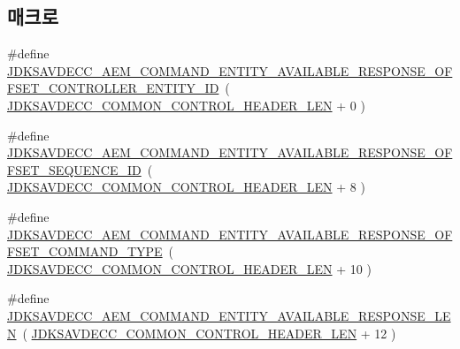 \subsection*{매크로}
\begin{DoxyCompactItemize}
\item 
\#define \hyperlink{group__command__entity__available__response_ga6311cc5609d1efec9e0e96bcf329511c}{J\+D\+K\+S\+A\+V\+D\+E\+C\+C\+\_\+\+A\+E\+M\+\_\+\+C\+O\+M\+M\+A\+N\+D\+\_\+\+E\+N\+T\+I\+T\+Y\+\_\+\+A\+V\+A\+I\+L\+A\+B\+L\+E\+\_\+\+R\+E\+S\+P\+O\+N\+S\+E\+\_\+\+O\+F\+F\+S\+E\+T\+\_\+\+C\+O\+N\+T\+R\+O\+L\+L\+E\+R\+\_\+\+E\+N\+T\+I\+T\+Y\+\_\+\+ID}~( \hyperlink{group__jdksavdecc__avtp__common__control__header_gaae84052886fb1bb42f3bc5f85b741dff}{J\+D\+K\+S\+A\+V\+D\+E\+C\+C\+\_\+\+C\+O\+M\+M\+O\+N\+\_\+\+C\+O\+N\+T\+R\+O\+L\+\_\+\+H\+E\+A\+D\+E\+R\+\_\+\+L\+EN} + 0 )
\item 
\#define \hyperlink{group__command__entity__available__response_ga58797652b29de1dd66cca10f4ac77178}{J\+D\+K\+S\+A\+V\+D\+E\+C\+C\+\_\+\+A\+E\+M\+\_\+\+C\+O\+M\+M\+A\+N\+D\+\_\+\+E\+N\+T\+I\+T\+Y\+\_\+\+A\+V\+A\+I\+L\+A\+B\+L\+E\+\_\+\+R\+E\+S\+P\+O\+N\+S\+E\+\_\+\+O\+F\+F\+S\+E\+T\+\_\+\+S\+E\+Q\+U\+E\+N\+C\+E\+\_\+\+ID}~( \hyperlink{group__jdksavdecc__avtp__common__control__header_gaae84052886fb1bb42f3bc5f85b741dff}{J\+D\+K\+S\+A\+V\+D\+E\+C\+C\+\_\+\+C\+O\+M\+M\+O\+N\+\_\+\+C\+O\+N\+T\+R\+O\+L\+\_\+\+H\+E\+A\+D\+E\+R\+\_\+\+L\+EN} + 8 )
\item 
\#define \hyperlink{group__command__entity__available__response_ga4b17fb9462ad3c21c1dd8a5400c70e34}{J\+D\+K\+S\+A\+V\+D\+E\+C\+C\+\_\+\+A\+E\+M\+\_\+\+C\+O\+M\+M\+A\+N\+D\+\_\+\+E\+N\+T\+I\+T\+Y\+\_\+\+A\+V\+A\+I\+L\+A\+B\+L\+E\+\_\+\+R\+E\+S\+P\+O\+N\+S\+E\+\_\+\+O\+F\+F\+S\+E\+T\+\_\+\+C\+O\+M\+M\+A\+N\+D\+\_\+\+T\+Y\+PE}~( \hyperlink{group__jdksavdecc__avtp__common__control__header_gaae84052886fb1bb42f3bc5f85b741dff}{J\+D\+K\+S\+A\+V\+D\+E\+C\+C\+\_\+\+C\+O\+M\+M\+O\+N\+\_\+\+C\+O\+N\+T\+R\+O\+L\+\_\+\+H\+E\+A\+D\+E\+R\+\_\+\+L\+EN} + 10 )
\item 
\#define \hyperlink{group__command__entity__available__response_gac62890c7584a06eb4c3e18d082690e5b}{J\+D\+K\+S\+A\+V\+D\+E\+C\+C\+\_\+\+A\+E\+M\+\_\+\+C\+O\+M\+M\+A\+N\+D\+\_\+\+E\+N\+T\+I\+T\+Y\+\_\+\+A\+V\+A\+I\+L\+A\+B\+L\+E\+\_\+\+R\+E\+S\+P\+O\+N\+S\+E\+\_\+\+L\+EN}~( \hyperlink{group__jdksavdecc__avtp__common__control__header_gaae84052886fb1bb42f3bc5f85b741dff}{J\+D\+K\+S\+A\+V\+D\+E\+C\+C\+\_\+\+C\+O\+M\+M\+O\+N\+\_\+\+C\+O\+N\+T\+R\+O\+L\+\_\+\+H\+E\+A\+D\+E\+R\+\_\+\+L\+EN} + 12 )
\end{DoxyCompactItemize}

